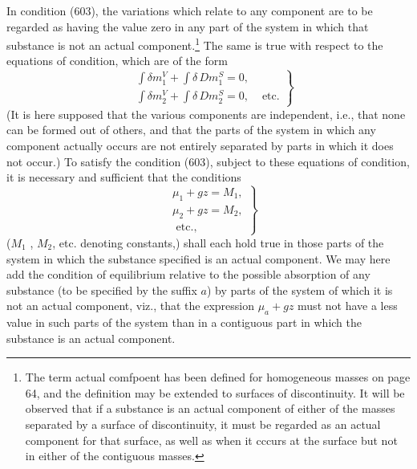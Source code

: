 \documentclass[12pt]{memoir}
\newcommand{\dd}{\delta}
\begin{document}
In condition (603), the variations which relate to any component are to be regarded as having the value zero in any part of the system in which that substance is not an actual component.\footnote{The term actual comfpoent has been defined for homogeneous masses on page 64, and the definition may be extended to surfaces of discontinuity. It will be observed that if a substance is an actual component of either of the masses separated by a surface of discontinuity, it must be regarded as an actual component for that surface, as well as when it cccurs at the surface but not in either of the contiguous masses.} The same is true with respect to the equations of condition, which are of the form
\begin{equation} \left. \begin{aligned}
&\int \dd m_1^V +\int \dd \, Dm_1^S = 0, \\
&\int \dd m_2^V +\int \dd \, Dm_2^S = 0,
&\text{ etc.}            \end{aligned} \right\}    \label{616} \end{equation}
(It is here supposed that the various components are independent, i.e., that none can be formed out of others, and that the parts of the system in which any component actually occurs are not entirely separated by parts in which it does not occur.)  To satisfy the condition (603), subject to these equations of condition, it is necessary and sufficient that the conditions
\begin{equation} \left. \begin{aligned}
&\mu_1 + gz = M_1, \\
&\mu_2 + gz = M_2, \\
&\text{ etc.},\end{aligned} \right\}    \label{617} \end{equation}
($M_1$ , $M_2$, etc. denoting constants,) shall each hold true in those parts of the system in which the substance specified is an actual component. We may here add the condition of equilibrium relative to the possible absorption of any substance (to be specified by the suffix $a$) by parts of the system of which it is not an actual component, viz., that the expression $\mu_a + gz$ must not have a less value in such parts of the system than in a contiguous part in which the substance is an actual component.
\end{document}
